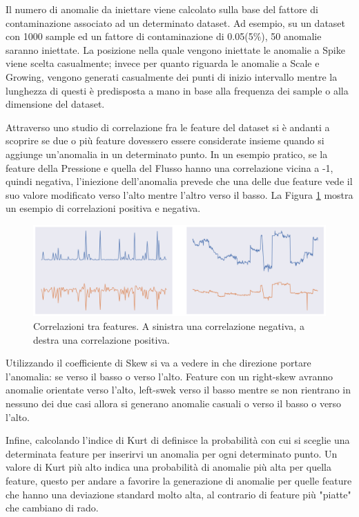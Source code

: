 Il numero di anomalie da iniettare viene calcolato sulla base del fattore di contaminazione associato ad un determinato dataset. Ad esempio, su un dataset con 1000 sample ed un fattore di contaminazione di 0.05(5\%), 50 anomalie saranno iniettate.
La posizione nella quale vengono iniettate le anomalie a Spike viene scelta casualmente; invece per quanto riguarda le anomalie a Scale e Growing, vengono generati casualmente dei punti di inizio intervallo mentre la lunghezza di questi è predisposta a mano in base alla frequenza dei sample o alla dimensione del dataset.

Attraverso uno studio di correlazione fra le feature del dataset si è andanti a scoprire se due o più feature dovessero essere considerate insieme quando si aggiunge un'anomalia in un determinato punto. In un esempio pratico, se la feature della Pressione e quella del Flusso hanno una correlazione vicina a -1, quindi negativa, l'iniezione dell'anomalia prevede che una delle due feature vede il suo valore modificato verso l'alto mentre l'altro verso il basso. La Figura \ref{feature-correlazioni} mostra un esempio di correlazioni positiva e negativa.
\begin{figure}[t]
	\centering
	\includegraphics[width=14cm, scale=1]{images/corr}
	\caption{Correlazioni tra features. A sinistra una correlazione negativa, a destra una correlazione positiva.}
	\label{feature-correlazioni}
		
\end{figure}

Utilizzando il coefficiente di Skew si va a vedere in che direzione portare l'anomalia: se verso il basso o verso l'alto. Feature con un right-skew avranno anomalie orientate verso l'alto, left-swek verso il basso mentre se non rientrano in nessuno dei due casi allora si generano anomalie casuali o verso il basso o verso l'alto.

Infine, calcolando l'indice di Kurt di definisce la probabilità con cui si sceglie una determinata feature per inserirvi un anomalia per ogni determinato punto. Un valore di Kurt più alto indica una probabilità di anomalie più alta per quella feature, questo per andare a favorire la generazione di anomalie per quelle feature che hanno una deviazione standard molto alta, al contrario di feature più "piatte" che cambiano di rado.


